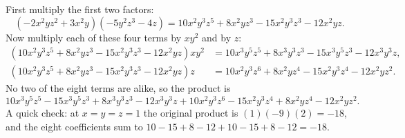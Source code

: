 First multiply the first two factors:
\[
\left(-2x^2yz^2+3x^2y\right)\left(-5y^2z^3-4z\right)=10x^2y^3z^5+8x^2yz^3-15x^2y^3z^3-12x^2yz .
\]
Now multiply each of these four terms by $xy^2$ and by $z$:
\[
\begin{aligned}
\left(10x^2y^3z^5+8x^2yz^3-15x^2y^3z^3-12x^2yz\right)xy^2&=10x^3y^5z^5+8x^3y^3z^3-15x^3y^5z^3-12x^3y^3z,\\
\left(10x^2y^3z^5+8x^2yz^3-15x^2y^3z^3-12x^2yz\right)z&=10x^2y^3z^6+8x^2yz^4-15x^2y^3z^4-12x^2yz^2 .
\end{aligned}
\]
No two of the eight terms are alike, so the product is
\[
\boxed{10x^3y^5z^5-15x^3y^5z^3+8x^3y^3z^3-12x^3y^3z+10x^2y^3z^6-15x^2y^3z^4+8x^2yz^4-12x^2yz^2}.
\]
A quick check: at $x=y=z=1$ the original product is $(1)(-9)(2)=-18$, and the eight coefficients sum to $10-15+8-12+10-15+8-12=-18$.
